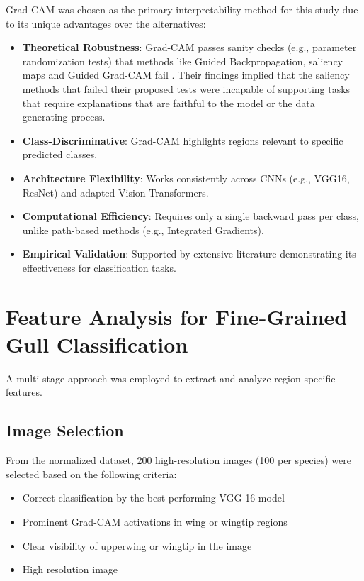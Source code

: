 \documentclass[a4paper,12pt]{report}
\begin{document}
Grad-CAM was chosen as the primary interpretability method for this study due to its unique advantages over the alternatives:

\begin{itemize}
\item \textbf{Theoretical Robustness}: Grad-CAM passes sanity checks (e.g., parameter randomization tests) that methods like Guided Backpropagation, saliency maps and Guided Grad-CAM fail \citep{Adebayo2018}. Their findings implied that the saliency methods that failed their proposed tests were incapable of supporting tasks that require explanations that are faithful to the model or the data generating process.
\item \textbf{Class-Discriminative}: Grad-CAM highlights regions relevant to specific predicted classes.
\item \textbf{Architecture Flexibility}: Works consistently across CNNs (e.g., VGG16, ResNet) and adapted Vision Transformers.
\item \textbf{Computational Efficiency}: Requires only a single backward pass per class, unlike path-based methods (e.g., Integrated Gradients).
\item \textbf{Empirical Validation}: Supported by extensive literature \citep{Selvaraju_2019, chefer2021generic} demonstrating its effectiveness for classification tasks.
\end{itemize}

\section{Feature Analysis for Fine-Grained Gull Classification}

A multi-stage approach was employed to extract and analyze region-specific features.

\subsection{Image Selection}
From the normalized dataset, 200 high-resolution images (100 per species) were selected based on the following criteria:
\begin{itemize}
\item Correct classification by the best-performing VGG-16 model
\item Prominent Grad-CAM activations in wing or wingtip regions
\item Clear visibility of upperwing or wingtip in the image
\item High resolution image
\end{itemize}
\end{document}

